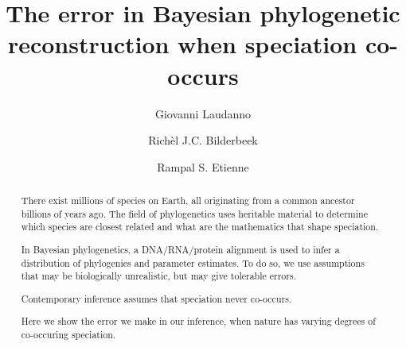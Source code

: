 \documentclass{article}
\title{The error in Bayesian phylogenetic reconstruction when speciation co-occurs}
\author[1]{Giovanni Laudanno}
\author[1]{Rich\`el J.C. Bilderbeek}
\author[1]{Rampal S. Etienne}
\affil[1]{Groningen Institute for Evolutionary Life Sciences, University of Groningen, Groningen, The Netherlands}
\begin{document}
\maketitle

\begin{abstract}



  There exist millions of species on Earth,
  all originating from a common ancestor billions
  of years ago.
  The field of phylogenetics uses heritable material
  to determine which species are closest related and what are
  the mathematics that shape speciation.
  
  In Bayesian phylogenetics, a DNA/RNA/protein alignment
  is used to infer a distribution of phylogenies and parameter estimates.
  To do so, we use assumptions that may be biologically unrealistic,
  but may give tolerable errors.
  
  Contemporary inference assumes that speciation
  never co-occurs.

  Here we show the error we make in our inference,
  when nature has varying degrees of co-occuring speciation.







\end{abstract}
\end{document}
